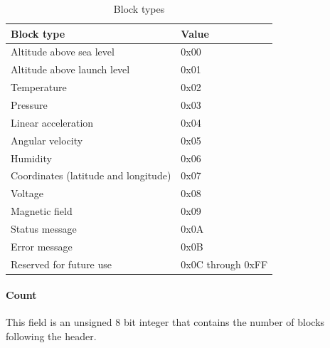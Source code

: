 \begin{table}[H]
    \centering
    \begin{tabular}{@{}ll@{}}
        \toprule
        Block type                           & Value             \\
        \midrule
        Altitude above sea level             & 0x00              \\
        Altitude above launch level          & 0x01              \\
        Temperature                          & 0x02              \\
        Pressure                             & 0x03              \\
        Linear acceleration                  & 0x04              \\
        Angular velocity                     & 0x05              \\
        Humidity                             & 0x06              \\
        Coordinates (latitude and longitude) & 0x07              \\
        Voltage                              & 0x08              \\
        Magnetic field                       & 0x09              \\
        Status message                       & 0x0A              \\
        Error message                        & 0x0B              \\
        Reserved for future use              & 0x0C through 0xFF \\
        \bottomrule
    \end{tabular}
    \caption{Block types}
    \label{table:block-types}
\end{table}

\paragraph{Count}

This field is an unsigned 8 bit integer that contains the number of blocks following the header.